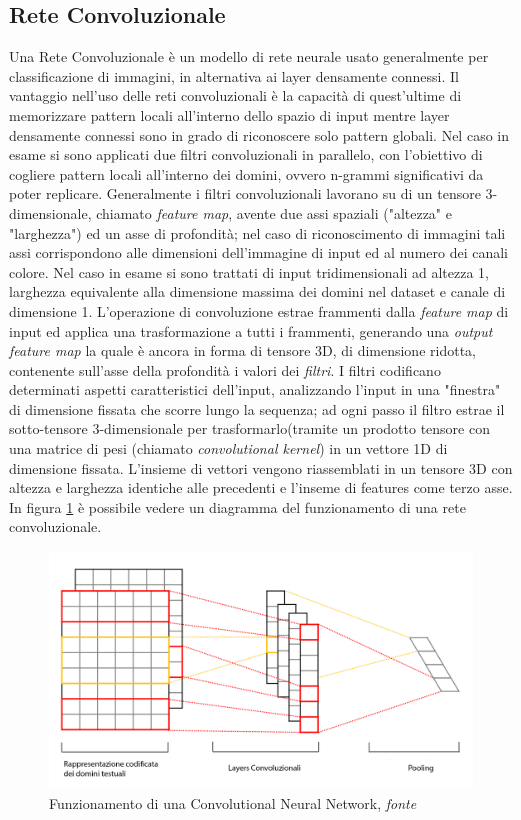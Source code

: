 \subsection{Rete Convoluzionale}
Una Rete Convoluzionale è un modello di rete neurale usato generalmente per classificazione di immagini, in alternativa ai layer densamente connessi. Il vantaggio nell'uso delle reti convoluzionali è la capacità di quest'ultime di memorizzare pattern locali all'interno dello spazio di input mentre layer densamente connessi sono in grado di riconoscere solo pattern globali. Nel caso in esame si sono applicati due filtri convoluzionali in parallelo, con l'obiettivo di cogliere pattern locali all'interno dei domini, ovvero n-grammi significativi da poter replicare. Generalmente i filtri convoluzionali lavorano su di un tensore 3-dimensionale, chiamato \textit{feature map}, avente due assi spaziali ("altezza" e "larghezza") ed un asse di profondità; nel caso di riconoscimento di immagini tali assi corrispondono alle dimensioni dell'immagine di input ed al numero dei canali colore. Nel caso in esame si sono trattati di input tridimensionali ad altezza 1, larghezza equivalente alla dimensione massima dei domini nel dataset e canale di dimensione 1. L'operazione di convoluzione estrae frammenti dalla \textit{feature map} di input ed applica una trasformazione a tutti i frammenti, generando una \textit{output feature map} la quale è ancora in forma di tensore 3D, di dimensione ridotta, contenente sull'asse della profondità i valori dei \textit{filtri}. I filtri codificano determinati aspetti caratteristici dell'input, analizzando l'input in una "finestra" di dimensione fissata che scorre lungo la sequenza; ad ogni passo il filtro estrae il sotto-tensore 3-dimensionale per trasformarlo(tramite un prodotto tensore con una matrice di pesi (chiamato \textit{convolutional kernel}) in un vettore 1D di dimensione fissata. L'insieme di vettori vengono riassemblati in un tensore 3D con altezza e larghezza identiche alle precedenti e l'inseme di features come terzo asse. In figura \ref{fig:cnn} è possibile vedere un diagramma del funzionamento di una rete convoluzionale.

\begin{figure}[!htb]
    \centering
	\includegraphics[width=\columnwidth]{figures/CNN.png}
	\caption{Funzionamento di una Convolutional Neural Network,\textit{ fonte} \cite{fig:cnnfonte} }
\label{fig:cnn}
\end{figure}


